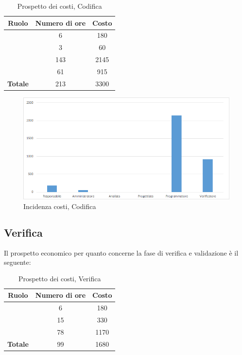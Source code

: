 \begin{table}[H]
	\begin{center}
		\begin{tabular}{|c|c|c|}
			\hline
			\textbf{Ruolo}	& \textbf{Numero di ore} & \textbf{Costo} \\
			\hline
			\Res	&	6  &	180	\\
			\hline
			\Amm	&	3  &	60	\\
			\hline
			\Progr	&	143  &	2145	\\
			\hline
			\Ver	&	61  &	915	\\
			\hline
			\textbf{Totale}  &	213 &	3300	\\
			\hline
		\end{tabular}
	\end{center}
	\caption{Prospetto dei costi, Codifica }
\end{table}

\begin{figure}[H]
	\centering
	\includegraphics[scale=0.6]{img/8-4.png}
	\caption{Incidenza costi, Codifica}
\end{figure}

\subsection{Verifica}
Il prospetto economico per quanto concerne la fase di verifica e validazione è il seguente:


\begin{table}[H]
	\begin{center}
		\begin{tabular}{|c|c|c|}
			\hline
			\textbf{Ruolo}	& \textbf{Numero di ore} & \textbf{Costo} \\
			\hline
			\Res	&	6  &	180	\\
			\hline
			\Prog	&	15  &	330	\\
			\hline
			\Ver	&	78  &	1170	\\
			\hline
			\textbf{Totale}  &	99  &	1680	\\
			\hline
		\end{tabular}
	\end{center}
	\caption{Prospetto dei costi, Verifica }
\end{table}

